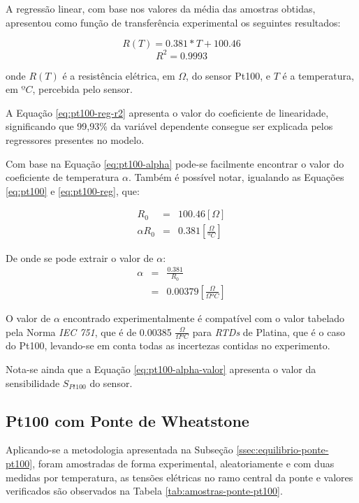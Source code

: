 \documentclass[a4paper]{instrumentacao}
\begin{document}
A regressão linear, com base nos valores da média das amostras obtidas, apresentou como função de transferência experimental os seguintes resultados:

\begin{equation}
	R(T) = 0.381*T + 100.46
	\label{eq:pt100-reg}
\end{equation}
\begin{equation}
	R^2=0.9993
	\label{eq:pt100-reg-r2}
\end{equation}

\noindent
onde $R(T)$ é a resistência elétrica, em $\Omega$, do sensor Pt100, e $T$ é a temperatura, em $ºC$, percebida pelo sensor.

A Equação \ref{eq:pt100-reg-r2} apresenta o valor do coeficiente de linearidade, significando que 99,93\% da variável dependente consegue ser explicada pelos regressores presentes no modelo.

Com base na Equação \ref{eq:pt100-alpha} pode-se facilmente encontrar o valor do coeficiente de temperatura $\alpha$. Também é possível notar, igualando as Equações \ref{eq:pt100} e \ref{eq:pt100-reg}, que:

\begin{eqnarray}
	R_0 &=& 100.46 [\Omega]\\
	\alpha R_0 &=& 0.381 [\frac{\Omega}{ºC}] \label{eq:pt100-alpha-valor}
\end{eqnarray}

De onde se pode extrair o valor de $\alpha$:
\begin{eqnarray}
	\alpha &=& \frac{0.381}{R_0} \\
	       &=& 0.00379 [\frac{\Omega}{\Omega ºC}]
\end{eqnarray}

O valor de $\alpha$ encontrado experimentalmente é compatível com o valor tabelado pela Norma \textit{IEC 751}, que é de 0.00385 $\frac{\Omega}{\Omega ºC}$ para \textit{RTDs} de Platina, que é o caso do Pt100, levando-se em conta todas as incertezas contidas no experimento.

Nota-se ainda que a Equação \ref{eq:pt100-alpha-valor} apresenta o valor da sensibilidade $S_{Pt100}$ do sensor.

\subsection{Pt100 com Ponte de Wheatstone }
Aplicando-se a metodologia apresentada na Subseção \ref{ssec:equilibrio-ponte-pt100}, foram amostradas de forma experimental, aleatoriamente e com duas medidas por temperatura, as tensões elétricas no ramo central da ponte e valores verificados são observados na Tabela \ref{tab:amostras-ponte-pt100}.
\end{document}
